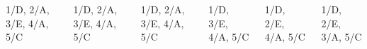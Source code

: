 \begin{columns}

  \begin{column}{.15\linewidth}\center
                  {1/D, 2/A, 3/E, 4/A, 5/C}
  \end{column}
  \begin{column}{.15\linewidth}\center
                  {1/D, 2/A, 3/E, 4/A, 5/C}
  \end{column}
  \begin{column}{.15\linewidth}\center
                  {1/D, 2/A, 3/E, 4/A, 5/C}
  \end{column}
  \begin{column}{.15\linewidth}\center
                  {1/D,      3/E, 4/A, 5/C}
  \end{column}
  \begin{column}{.15\linewidth}\center
                  {1/D, 2/E,      4/A, 5/C}
  \end{column}    
  \begin{column}{.15\linewidth}\center
                  {1/D, 2/E, 3/A,      5/C}
  \end{column}    
\end{columns}\vspace{-\baselineskip}
